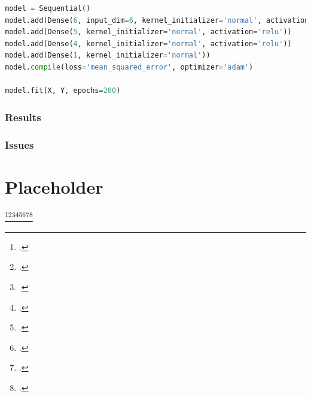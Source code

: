 \begin{lstlisting}[language=Python]
model = Sequential()
model.add(Dense(6, input_dim=6, kernel_initializer='normal', activation='relu'))
model.add(Dense(5, kernel_initializer='normal', activation='relu'))
model.add(Dense(4, kernel_initializer='normal', activation='relu'))
model.add(Dense(1, kernel_initializer='normal'))
model.compile(loss='mean_squared_error', optimizer='adam')

model.fit(X, Y, epochs=200)
\end{lstlisting}


\subsection{Results}

\subsection{Issues}

\appendix
\chapter{Placeholder}

\lipsum[1]\footcite{Schaefer2016}\footcite{dvorakMoon}\footcite{MaindlSummary}\footcite{Burger2018}\footcite{Dorninger}\footcite{CollisionParameters}\footcite{CollisionTypes}\footcite{RBF}
\nocite{*}

\printbibliography




